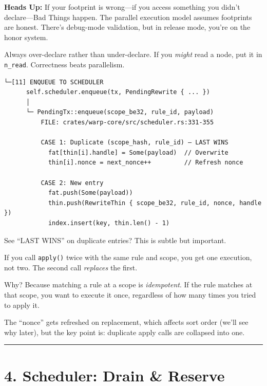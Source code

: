 \documentclass[11pt]{book}
\newenvironment{directors}
{\begin{mdframed}[
  linecolor=blue!60,
  linewidth=2pt,
  leftline=true,
  rightline=false,
  topline=false,
  bottomline=false,
  backgroundcolor=blue!3,
  innerleftmargin=12pt,
  innerrightmargin=10pt,
  innertopmargin=8pt,
  innerbottommargin=8pt,
  skipabove=12pt,
  skipbelow=12pt
]\small\sffamily\color{blue!70!black}}
{\end{mdframed}}
\newenvironment{watchout}
{\begin{mdframed}[
  linecolor=orange!80!black,
  linewidth=2pt,
  leftline=true,
  rightline=false,
  topline=false,
  bottomline=false,
  backgroundcolor=orange!5,
  innerleftmargin=12pt,
  innerrightmargin=10pt,
  innertopmargin=8pt,
  innerbottommargin=8pt,
  skipabove=12pt,
  skipbelow=12pt
]\small\sffamily\color{orange!70!black}\textbf{Heads Up:} }
{\end{mdframed}}
\begin{document}
\begin{watchout}
If your footprint is wrong---if you access something you didn't declare---Bad Things happen. The parallel execution model assumes footprints are honest. There's debug-mode validation, but in release mode, you're on the honor system.

Always over-declare rather than under-declare. If you \emph{might} read a node, put it in \texttt{n\_read}. Correctness beats parallelism.
\end{watchout}

\begin{verbatim}
└─[11] ENQUEUE TO SCHEDULER
      self.scheduler.enqueue(tx, PendingRewrite { ... })
      │
      └─ PendingTx::enqueue(scope_be32, rule_id, payload)
          FILE: crates/warp-core/src/scheduler.rs:331-355

          CASE 1: Duplicate (scope_hash, rule_id) — LAST WINS
            fat[thin[i].handle] = Some(payload)  // Overwrite
            thin[i].nonce = next_nonce++         // Refresh nonce

          CASE 2: New entry
            fat.push(Some(payload))
            thin.push(RewriteThin { scope_be32, rule_id, nonce, handle })
            index.insert(key, thin.len() - 1)
\end{verbatim}

\begin{directors}
See ``LAST WINS'' on duplicate entries? This is subtle but important.

If you call \texttt{apply()} twice with the same rule and scope, you get one execution, not two. The second call \emph{replaces} the first.

Why? Because matching a rule at a scope is \emph{idempotent}. If the rule matches at that scope, you want to execute it once, regardless of how many times you tried to apply it.

The ``nonce'' gets refreshed on replacement, which affects sort order (we'll see why later), but the key point is: duplicate apply calls are collapsed into one.
\end{directors}

\begin{center}\rule{0.5\linewidth}{0.5pt}\end{center}

\section{4. Scheduler: Drain \& Reserve}\label{scheduler-drain-reserve}
\end{document}

